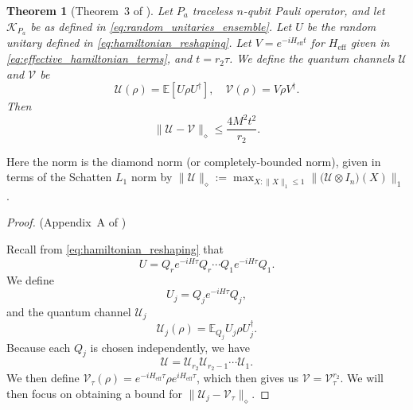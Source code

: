 \documentclass[twocolumn,superscriptaddress,aps,showpacs,amsmath,amstex,amssymb,citeautoscript,floatfix,pra,preprintnumbers]{revtex4-2}
\newtheorem{theorem}{Theorem}
\theoremstyle{plain}
\theoremstyle{plain}
\theoremstyle{plain}
\theoremstyle{plain}
\theoremstyle{plain}
\theoremstyle{plain}
\begin{document}
\begin{appendix}
\begin{theorem}[Theorem~3 of \cite{ma2024learningkbodyhamiltonianscompressed}]
    \label{thm:hamiltonian_reshaping}
    Let $P_a$ traceless $n$-qubit Pauli operator, and let $\mathcal{K}_{P_a}$ be as defined in \eqref{eq:random_unitaries_ensemble}.
    Let $U$ be the random unitary defined in \eqref{eq:hamiltonian_reshaping}. Let $V=e^{-iH_{\mathrm{eff}}t}$ for $H_{\mathrm{eff}}$ given in \eqref{eq:effective_hamiltonian_terms}, and $t=r_2\tau$.
    We define the quantum channels $\mathcal{U}$ and $\mathcal{V}$ be
    \[
    \mathcal{U}(\rho) = \mathbb{E}[U\rho U^\dag],\quad \mathcal{V}(\rho) = V\rho V^\dag.
    \]
    Then 
    \[
    \|\mathcal{U}-\mathcal{V}\|_{\diamond}\leq \frac{4M^2 t^2}{r_2}.
    \]
\end{theorem}
Here the norm is the diamond norm (or completely-bounded norm), given in terms of the Schatten $L_1$ norm by $\|\mathcal{U}\|_\diamond := \max_{X : \|X\|_1 \le 1}\bigl\|\bigl(\mathcal{U} \otimes I_n\bigl)(X)\bigr\|_1$. 
\begin{proof}(Appendix~A of \cite{ma2024learningkbodyhamiltonianscompressed})

    Recall from \eqref{eq:hamiltonian_reshaping} that
    \[
    U = Q_r e^{-iH\tau} Q_r\cdots Q_1 e^{-iH\tau} Q_1.
    \]
    We define
    \[
    U_j = Q_j e^{-iH\tau} Q_j,
    \]
    and the quantum channel $\mathcal{U}_j$
    \[
    \mathcal{U}_j(\rho) = \mathbb{E}_{Q_j} U_j\rho U_j^\dag.
    \]
    Because each $Q_j$ is chosen independently, we have
    \[
    \mathcal{U} = \mathcal{U}_{r_2} \mathcal{U}_{r_2-1}\cdots \mathcal{U}_1.
    \]
    We then define $\mathcal{V}_\tau(\rho) = e^{-iH_{\mathrm{eff}}\tau}\rho e^{iH_{\mathrm{eff}}\tau}$, which then gives us $\mathcal{V} = \mathcal{V}_\tau^{r_2}$. We will then focus on obtaining a bound for $\|\mathcal{U}_j-\mathcal{V}_\tau\|_{\diamond}$.


\end{proof}
\end{appendix}
\end{document}
